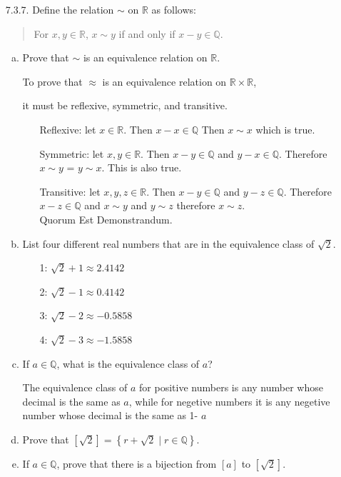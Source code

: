 \documentclass[11pt]{article}
\newcommand{\R}{\mathbb R}
\newcommand{\Q}{\mathbb Q}
\begin{document}
\begin{itemize}
\hrulefill

\item[7.3.7.] Define the relation $\sim$ on $\R$ as follows:
\begin{quote}
For $x,y\in\R$, $x\sim y$ if and only if $x-y\in\Q$.
\end{quote}
\begin{enumerate}[(a)]
\item Prove that $\sim$ is an equivalence relation on $\R$.
\par To prove that $\approx$ is an equivalence relation on $\R\times\R$,
\par it must be reflexive, symmetric, and transitive.
\begin{enumerate}
    \item[Reflexive:] let $x\in \R$. Then $x-x\in\Q$ Then $x\sim x$ which is true.
    \item[Symmetric:] let $x,y\in \R$. Then $x-y\in\Q$ and $y-x\in\Q$.
                        Therefore $x\sim y$ = $y\sim x$. This is also true.
    \item[Transitive:] let $x,y,z\in \R$. Then $x-y\in\Q$ and $y-z\in\Q$.
                        Therefore $x-z\in\Q$ and $x\sim y$ and $y\sim z$ therefore $x\sim z$.\\
                        Quorum Est Demonstrandum.    
\end{enumerate}
\item List four different real numbers that are in the equivalence class of $\sqrt 2$.
\begin{itemize}
    \item[1:] $\sqrt{2} + 1 \approx 2.4142 $
    \item[2:] $\sqrt{2} - 1 \approx 0.4142$
    \item[3:] $\sqrt{2} - 2 \approx -0.5858$
    \item[4:] $\sqrt{2} - 3 \approx -1.5858$
\end{itemize}
\item If $a\in\Q$, what is the equivalence class of $a$?
\par The equivalence class of $a$ for positive numbers is any number whose decimal is the same as $a$,
while for negetive numbers it is any negetive number whose decimal is the same as 1- $a$
\item Prove that $\left[\sqrt 2\right]=\left\{r+\sqrt 2\mid r\in\Q\right\}$.
\item If $a\in \Q$, prove that there is a bijection from $[a]$ to $\left[\sqrt 2\right]$.
\end{enumerate}

\end{itemize}
\end{document}
